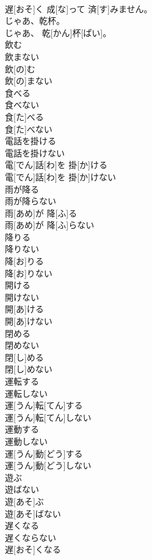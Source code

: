 \documentclass[8pt]{extreport}
\begin{document}
\begin{CJK}{UTF8}{min}
\\	遅[おそ]く 成[な]って 済[す]みません。
\\	じゃあ、乾杯。	
\\	じゃあ、 乾[かん]杯[ぱい]。
\\	飲む 
\\	飲まない	
\\	飲[の]む 
\\	飲[の]まない
\\	食べる 
\\	食べない	
\\	食[た]べる 
\\	食[た]べない
\\	電話を掛ける 
\\	電話を掛けない	
\\	電[でん]話[わ]を 掛[か]ける 
\\	電[でん]話[わ]を 掛[か]けない
\\	雨が降る 
\\	雨が降らない	
\\	雨[あめ]が 降[ふ]る 
\\	雨[あめ]が 降[ふ]らない
\\	降りる 
\\	降りない	
\\	降[お]りる 
\\	降[お]りない
\\	開ける 
\\	開けない	
\\	開[あ]ける 
\\	開[あ]けない
\\	閉める 
\\	閉めない	
\\	閉[し]める 
\\	閉[し]めない
\\	運転する 
\\	運転しない	
\\	運[うん]転[てん]する 
\\	運[うん]転[てん]しない
\\	運動する 
\\	運動しない	
\\	運[うん]動[どう]する 
\\	運[うん]動[どう]しない
\\	遊ぶ 
\\	遊ばない	
\\	遊[あそ]ぶ 
\\	遊[あそ]ばない
\\	遅くなる 
\\	遅くならない	
\\	遅[おそ]くなる 

\end{CJK}
\end{document}
